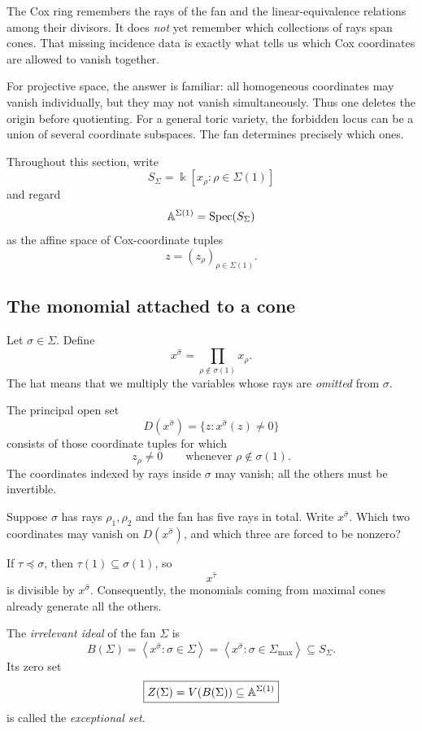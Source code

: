 The Cox ring remembers the rays of the fan and the linear-equivalence
relations among their divisors. It does \emph{not} yet remember which
collections of rays span cones. That missing incidence data is exactly
what tells us which Cox coordinates are allowed to vanish together.

For projective space, the answer is familiar: all homogeneous
coordinates may vanish individually, but they may not vanish
simultaneously. Thus one deletes the origin before quotienting. For a
general toric variety, the forbidden locus can be a union of several
coordinate subspaces. The fan determines precisely which ones.

Throughout this section, write
\[
S_\Sigma=\Bbbk[x_\rho:\rho\in\Sigma(1)]
\]
and regard
\[
\mathbb{A}^{\Sigma(1)}=\operatorname{Spec}(S_\Sigma)
\]
as the affine space of Cox-coordinate tuples
\[
z=(z_\rho)_{\rho\in\Sigma(1)}.
\]

\subsection{The monomial attached to a cone}

Let \(\sigma\in\Sigma\). Define
\[
\boxed{
x^{\widehat\sigma}
=
\prod_{\rho\notin\sigma(1)}x_\rho.
}
\]
The hat means that we multiply the variables whose rays are
\emph{omitted} from \(\sigma\).

The principal open set
\[
D(x^{\widehat\sigma})
=
\{z:x^{\widehat\sigma}(z)\neq0\}
\]
consists of those coordinate tuples for which
\[
z_\rho\neq0
\qquad
\text{whenever }\rho\notin\sigma(1).
\]
The coordinates indexed by rays inside \(\sigma\) may vanish; all the
others must be invertible.

\begin{pauseandthink}
Suppose \(\sigma\) has rays \(\rho_1,\rho_2\) and the fan has five
rays in total. Write \(x^{\widehat\sigma}\). Which two coordinates may
vanish on \(D(x^{\widehat\sigma})\), and which three are forced to be
nonzero?
\end{pauseandthink}

If \(\tau\preceq\sigma\), then \(\tau(1)\subseteq\sigma(1)\), so
\[
x^{\widehat\tau}
\]
is divisible by \(x^{\widehat\sigma}\). Consequently, the monomials
coming from maximal cones already generate all the others.

\begin{definition}
\label{def:irrelevant-ideal}
The \emph{irrelevant ideal} of the fan \(\Sigma\) is
\[
\boxed{
B(\Sigma)
=
\left\langle
x^{\widehat\sigma}:\sigma\in\Sigma
\right\rangle
=
\left\langle
x^{\widehat\sigma}:\sigma\in\Sigma_{\max}
\right\rangle
\subseteq S_\Sigma.
}
\]
Its zero set
\[
\boxed{
Z(\Sigma)=V(B(\Sigma))
\subseteq\mathbb{A}^{\Sigma(1)}
}
\]
is called the \emph{exceptional set}.
\end{definition}


